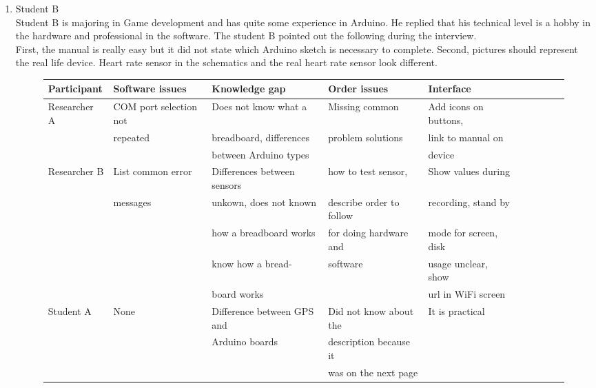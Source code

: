 \documentclass[conference]{IEEEtran}
\begin{document}
\begin{enumerate}
\begin{enumerate}
					\item Student B\\
					Student B is majoring in Game development and has  quite some experience in Arduino. He replied that his technical level is a hobby in the hardware and professional in the software. The student B pointed out the following during the interview.\\
					First, the manual is really easy but it did not state which Arduino sketch is necessary to complete.
					Second, pictures should represent the real life device. Heart rate sensor in the schematics and the real heart rate sensor look different.\\
		\begin{figure*}[!ht]
			\centering
			\begin{tabular}{ | l | l | l | l | l | l | l | l | l | l | }
				\hline
			Participant		& Software issues			& Knowledge gap					& Order issues				& Interface				\\ \hline \hline
			
			
			Researcher A	& COM port selection not	& Does not know what a			& Missing common			& Add icons on buttons,	\\ 
							& repeated					& breadboard, differences		& problem solutions			& link to manual on		\\ 
							& 							& between Arduino types			& 							& device				\\ \hline
							
			Researcher B	& List common error			& Differences between sensors	& how to test sensor,		& Show values during	\\ 
							& messages 					& unkown, does not known 		& describe order to	follow	& recording, stand by	\\
							& 							& how a breadboard works		& for doing	hardware and	& mode for screen, disk	\\
							& 							& know how a bread-				& software					& usage unclear, show	\\
							& 							& board works					& 							& url in WiFi screen	\\	\hline

			Student A		& None						& Difference between GPS and 	& Did not know about the	& It is practical		\\
							&  							& Arduino boards				& description because it 	& 						\\
							&  							& 								& was on the next page		& 						\\ \hline


\end{tabular}
\end{figure*}
\end{enumerate}
\end{enumerate}
\end{document}

